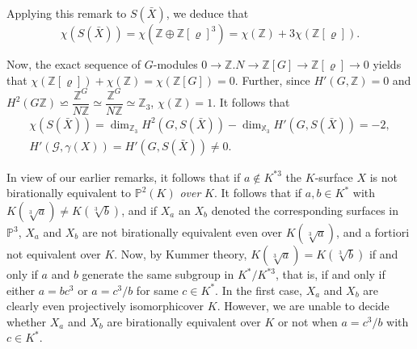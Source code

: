 Applying this remark to $S(\bar{X})$, we deduce that
$$
\chi (S(\bar{X}))= \chi (\mathbb{Z} \oplus \mathbb{Z}[\varrho]^3)=
\chi (\mathbb{Z})+3 \chi (\mathbb{Z}[\varrho]). 
$$

Now, the exact sequence of $G$-modules $0 \to \mathbb{Z} . N \to
\mathbb{Z} [G] \to \mathbb{Z} [\varrho] \to 0$ yields that $\chi
(\mathbb{Z}[\varrho]) + \chi (\mathbb{Z}) = \chi (\mathbb{Z}
       [G])=0$. Further, since $H'(G,\mathbb{Z}) =0$ and $H^2 (G
       \mathbb{Z}) \backsimeq \dfrac{\mathbb{Z}^G}{N \mathbb{Z}} 
\simeq \dfrac{\mathbb{Z}^G}{N \mathbb{Z}} \simeq \mathbb{Z}_3$, $\chi
(\mathbb{Z})=1$. It follows that
\begin{gather*}
  \chi (S(\bar{X}))= \dim_{\mathbb{Z}_3} H^2(G, S(\bar{X}))-
  \dim_{\mathbb{X}_3} H'(G,S(\bar{X}))=-2,\\ 
  H' (\mathscr{G}, \gamma (X)) = H' (G,S(\bar{X}))\neq 0.
\end{gather*}

In view of our earlier remarks, it follows that if $a \not\in K^{*3}$
the $K$-surface $X$ is not birationally equivalent to $\mathbb{P}^2
(K)$ \textit{over} $K$. It follows that if $a, b \in K^*$ with $K (
\sqrt[3]{a}) \neq K( \sqrt[3]{b})$, and if $X_a$ an $X_b$ denoted the
corresponding surfaces in $\mathbb{P}^3$, $X_a$ and $X_b$ are not
birationally equivalent even over $K(\sqrt[3]{a})$, and a fortiori not
equivalent over $K$. Now, by Kummer theory, $K(\sqrt[3]{a}) =
K(\sqrt[3]{b})$ if and only if $a$ and $b$ generate the same subgroup in
$K^* / K^{*3}$, that is, if and only if either $a= bc^3$ or $a= c^3/b$
for same $c \in K^*$. In the first case, $X_a$ and $X_b$ are clearly
even projectively isomorphic\pageoriginale over $K$. However, we are unable to
decide whether $X_a$ and $X_b$ are birationally equivalent over $K$ or
not when $a= c^3/b$ with $c \in K^*$. 

